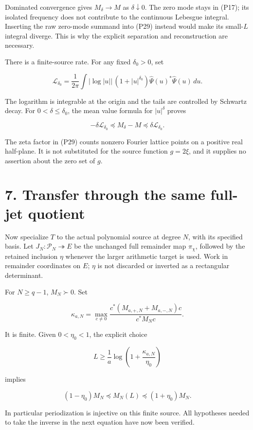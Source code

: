 \documentclass[
]{article}
\begin{document}
Dominated convergence gives \(M_\delta\to M\) as \(\delta\downarrow0\).
The zero mode stays in (P17); its isolated frequency does not contribute
to the continuous Lebesgue integral. Inserting the raw zero-mode summand
into (P29) instead would make its small-\(L\) integral diverge. This is
why the explicit separation and reconstruction are necessary.

There is a finite-source rate. For any fixed \(\delta_0>0\), set

\[
\mathcal L_{\delta_0}=\frac1{2\pi}\int
|\log|u||\,(1+|u|^{\delta_0})
\widehat\Psi(u)^*\widehat\Psi(u)\,du.
\tag{P31}
\]

The logarithm is integrable at the origin and the tails are controlled
by Schwartz decay. For \(0<\delta\le\delta_0\), the mean value formula
for \(|u|^\delta\) proves

\[
-\delta\mathcal L_{\delta_0}\preceq M_\delta-M
\preceq\delta\mathcal L_{\delta_0}.
\tag{P32}
\]

The zeta factor in (P29) counts nonzero Fourier lattice points on a
positive real half-plane. It is not substituted for the source function
\(g=2\xi\), and it supplies no assertion about the zero set of \(g\).

\section{7. Transfer through the same full-jet
quotient}\label{transfer-through-the-same-full-jet-quotient}

Now specialize \(T\) to the actual polynomial source at degree \(N\),
with its specified basis. Let \(J_N:\mathcal P_N\twoheadrightarrow E\)
be the unchanged full remainder map \(\pi_\chi\), followed by the
retained inclusion \(\eta\) whenever the larger arithmetic target is
used. Work in remainder coordinates on \(E\); \(\eta\) is not discarded
or inverted as a rectangular determinant.

For \(N\ge q-1\), \(M_N\succ0\). Set

\[
\kappa_{a,N}=
\max_{c\ne0}\frac{c^*(M_{a,+,N}+M_{a,-,N})c}{c^*M_Nc}.
\tag{P33}
\]

It is finite. Given \(0<\eta_0<1\), the explicit choice

\[
L\ge\frac1a\log\left(1+\frac{\kappa_{a,N}}{\eta_0}\right)
\tag{P34}
\]

implies

\[
(1-\eta_0)M_N\preceq M_N(L)\preceq(1+\eta_0)M_N.
\tag{P35}
\]

In particular periodization is injective on this finite source. All
hypotheses needed to take the inverse in the next equation have now been
verified.
\end{document}
